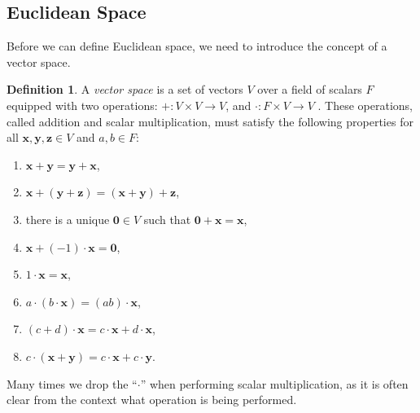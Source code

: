 \documentclass{article}
\newcommand{\x}{\mathbf{x}}
\newcommand{\y}{\mathbf{y}}
\newcommand{\z}{\mathbf{z}}
\newcommand{\ze}{\mathbf{0}}
\theoremstyle{definition}
\newtheorem{definition}{Definition}[section]
\begin{document}
\subsection{Euclidean Space}
Before we can define Euclidean space, we need to introduce the concept of a vector space. 
\begin{definition}
	A \textit{\color{red}vector space} is a set of vectors $ V $ over a field of scalars $ F $ equipped with two operations: $ +:V\times V\to V $, and $ \cdot:F\times V\to V $ . These operations, called addition and scalar multiplication, must satisfy the following properties for all $ \x,\y,\mathbf{z}\in V $ and $ a,b\in F $:
	\begin{enumerate}
		\item $ \x+\y=\y+\x $,
		\item $ \x+(\y+\z)=(\x+\y)+\z $,
		\item there is a unique $ \mathbf{0}\in V $ such that $ \ze+\x=\x $,
		\item $ \x+(-1)\cdot\x=\ze $,
		\item $ 1\cdot\x=\x $,
		\item $ a\cdot(b\cdot\x)=(ab)\cdot\x $,
		\item $ (c+d)\cdot\x=c\cdot\x+d\cdot\x $,
		\item $ c\cdot(\x+\y)=c\cdot\x+c\cdot\y $.
	\end{enumerate}
\end{definition}
Many times we drop the ``$ \cdot $'' when performing scalar multiplication, as it is often clear from the context what operation is being performed. 
\end{document}
